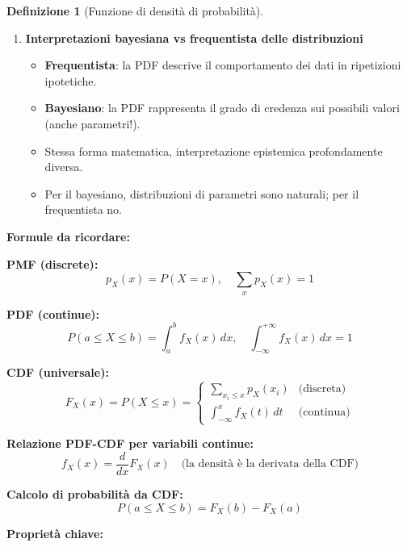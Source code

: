 \documentclass[
  italian,
  letterpaper,
  a4paper,
  11pt,
  open=any]{scrbook}
\providecommand{\tightlist}{%
  \setlength{\itemsep}{0pt}\setlength{\parskip}{0pt}}
\theoremstyle{plain}
\theoremstyle{definition}
\theoremstyle{definition}
\newtheorem{definition}{Definizione}[chapter]
\theoremstyle{remark}
\begin{document}
\begin{definition}[Funzione di densità di
probabilità]
\begin{tcolorbox}
\begin{enumerate}
  \begin{itemize}
  \tightlist
  \item
    \(F_X(x) = P(X \leq x)\) vale sia per discrete che per continue.
  \item
    Discrete: funzione a gradini con salti in corrispondenza dei valori
    possibili.
  \item
    Continue: funzione liscia e crescente.
  \item
    Proprietà universali: monotona non decrescente, \(F(-\infty) = 0\),
    \(F(+\infty) = 1\).
  \end{itemize}
\item
  \textbf{Interpretazioni bayesiana vs frequentista delle distribuzioni}

  \begin{itemize}
  \tightlist
  \item
    \textbf{Frequentista}: la PDF descrive il comportamento dei dati in
    ripetizioni ipotetiche.
  \item
    \textbf{Bayesiano}: la PDF rappresenta il grado di credenza sui
    possibili valori (anche parametri!).
  \item
    Stessa forma matematica, interpretazione epistemica profondamente
    diversa.
  \item
    Per il bayesiano, distribuzioni di parametri sono naturali; per il
    frequentista no.
  \end{itemize}
\end{enumerate}

\textbf{Formule da ricordare:}

\textbf{PMF (discrete):} \[
p_X(x) = P(X = x), \quad \sum_{x} p_X(x) = 1
\]

\textbf{PDF (continue):} \[
P(a \leq X \leq b) = \int_a^b f_X(x) \, dx, \quad \int_{-\infty}^{+\infty} f_X(x) \, dx = 1
\]

\textbf{CDF (universale):} \[
F_X(x) = P(X \leq x) = \begin{cases}
\sum_{x_i \leq x} p_X(x_i) & \text{(discreta)} \\
\int_{-\infty}^x f_X(t) \, dt & \text{(continua)}
\end{cases}
\]

\textbf{Relazione PDF-CDF per variabili continue:} \[
f_X(x) = \frac{d}{dx} F_X(x) \quad \text{(la densità è la derivata della CDF)}
\]

\textbf{Calcolo di probabilità da CDF:} \[
P(a \leq X \leq b) = F_X(b) - F_X(a)
\]

\textbf{Proprietà chiave:}


\end{tcolorbox}
\end{definition}
\end{document}
